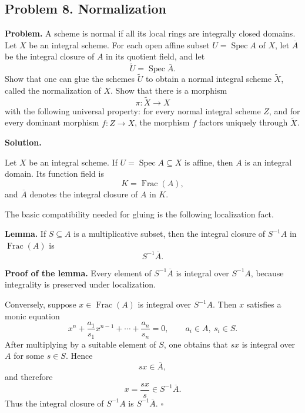 
\subsection*{Problem 8. Normalization}

\textbf{Problem.}
A scheme is normal if all its local rings are integrally closed domains.
Let \(X\) be an integral scheme. For each open affine subset
\(U=\operatorname{Spec} A\) of \(X\), let \(\overline{A}\) be the integral
closure of \(A\) in its quotient field, and let
\[
\widetilde{U}=\operatorname{Spec}\overline{A}.
\]
Show that one can glue the schemes \(\widetilde{U}\) to obtain a normal
integral scheme \(\widetilde{X}\), called the normalization of \(X\).
Show that there is a morphism
\[
\pi:\widetilde{X}\longrightarrow X
\]
with the following universal property: for every normal integral scheme
\(Z\), and for every dominant morphism \(f:Z\to X\), the morphism \(f\)
factors uniquely through \(\widetilde{X}\).

\textbf{Solution.}

Let \(X\) be an integral scheme. If \(U=\operatorname{Spec}A\subseteq X\)
is affine, then \(A\) is an integral domain. Its function field is
\[
K=\operatorname{Frac}(A),
\]
and \(\overline{A}\) denotes the integral closure of \(A\) in \(K\).

The basic compatibility needed for gluing is the following localization
fact.

\medskip

\textbf{Lemma.}
If \(S\subseteq A\) is a multiplicative subset, then the integral closure
of \(S^{-1}A\) in \(\operatorname{Frac}(A)\) is
\[
S^{-1}\overline{A}.
\]

\textbf{Proof of the lemma.}
Every element of \(S^{-1}\overline{A}\) is integral over \(S^{-1}A\),
because integrality is preserved under localization.

Conversely, suppose \(x\in \operatorname{Frac}(A)\) is integral over
\(S^{-1}A\). Then \(x\) satisfies a monic equation
\[
x^n+\frac{a_1}{s_1}x^{n-1}+\cdots+\frac{a_n}{s_n}=0,
\qquad a_i\in A,\ s_i\in S.
\]
After multiplying by a suitable element of \(S\), one obtains that
\(sx\) is integral over \(A\) for some \(s\in S\). Hence
\[
sx\in \overline{A},
\]
and therefore
\[
x=\frac{sx}{s}\in S^{-1}\overline{A}.
\]
Thus the integral closure of \(S^{-1}A\) is \(S^{-1}\overline{A}\).
\(\square\)

